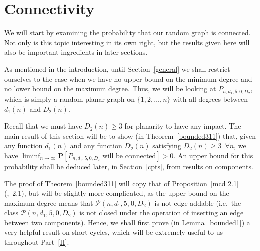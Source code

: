 \documentclass{article}
\newtheorem{Proof of Theorem}{Proof of Theorem}
\begin{document}
\newpage
\section{Connectivity} \label{bconn}















We will start by examining the probability that our random graph is connected.
Not only is this topic interesting in its own right,
but the results given here will also be important ingredients in later sections.

As mentioned in the introduction,
until Section~\ref{general} we shall restrict ourselves to the case when
we have no upper bound on the minimum degree and no lower bound on the maximum degree.
Thus, we will be looking at $P_{n,d_{1},5,0,D_{2}}$,
which is simply a random planar graph on $\{ 1,2, \ldots, n \}$
with all degrees between $d_{1}(n)$ and $D_{2}(n)$.

Recall that we must have $D_{2}(n) \geq 3$ for planarity to have any impact.
The main result of this section will be to show (in Theorem~\ref{bounded311}) that,
given any function $d_{1}(n)$ and any function $D_{2}(n)$ satisfying $D_{2}(n) \geq 3$~$\forall n$,
we have 
$\liminf_{n \to \infty} \mathbf{P}[P_{n,d_{1},5,0,D_{2}} \textrm{ will be connected}]>0$.
An upper bound for this probability shall be deduced later, in Section~\ref{cpts}, 
from results on components.

The proof of Theorem~\ref{bounded311} will copy that of Proposition~\ref{mcd 2.1}(\cite{mcd},~2.1),
but will be slightly more complicated,
as the upper bound on the maximum degree means that $\mathcal{P}(n,d_{1},5,0,D_{2})$ is not edge-addable
(i.e.~the class $\mathcal{P}(n,d_{1},5,0,D_{2})$ 
is not closed under the operation of inserting an edge between two components).
Hence, we shall first prove (in Lemma~\ref{bounded1}) a very helpful result on short cycles,
which will be extremely useful to us throughout Part~\ref{II}.





\begin{figure}[omitted: a diagram of this paper's results, not reproduced here]\end{figure}
\end{document}
